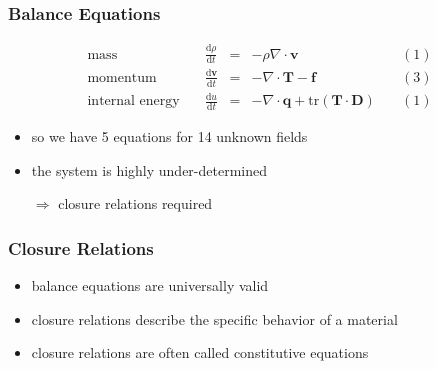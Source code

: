 \documentclass[hide notes,intlimits]{beamer}
\begin{document}
\begin{frame}
  \frametitle{Balance Equations}
  \large{
  \begin{equation*}
  \begin{array}{lcclc}
    \text{mass} \quad &  \frac{\text{d} \rho}{\text{d} t} & = & -\rho\nabla \cdot \mathbf{v} \quad & (1)\\[.25em]
    \text{momentum} \quad & \frac{\text{d} \mathbf{v}}{\text{d} t} & = & -\nabla \cdot \mathbf{T} - \mathbf{f} \quad & (3) \\[.25em]
    \text{internal energy} \quad & \frac{\text{d} u}{\text{d} t} & = & - \nabla \cdot \mathbf{q} + \text{tr} \left(\mathbf{T}\cdot\mathbf{D}\right) \quad & (1)
  \end{array}
  \end{equation*}
  }
  \begin{itemize}
   \item so we have 5 equations for 14 unknown fields
   \item the system is highly under-determined
   \item[$\Rightarrow$] \alert{closure relations} required
 \end{itemize}
\end{frame}

\begin{frame}
  \frametitle{Closure Relations}
  \begin{itemize}
    \item \alert{balance equations} are universally valid
    \item \alert{closure relations} describe the specific behavior of a material
    \item \alert{closure relations} are often called \alert{constitutive equations}
  \end{itemize}
\end{frame}
\end{document}
